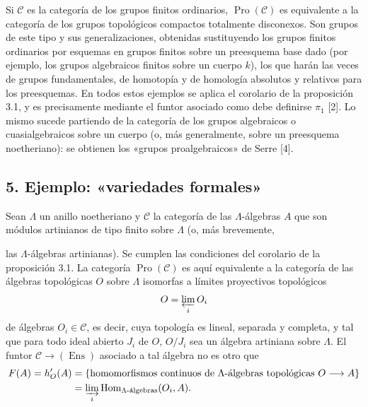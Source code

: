 \documentclass[11pt,twoside,openany]{book}
\numberwithin{equation}{section}
\newcommand{\src}[1]{%
  \phantomsection\hypertarget{src:#1}{}%
  \marginpar{\raggedleft\footnotesize\sffamily #1}%
}
\theoremstyle{plain}
\theoremstyle{definition}
\theoremstyle{remark}
\newcommand{\FgaUnitKey}{frontmatter}
\renewcommand{\src}[1]{%
  \phantomsection\hypertarget{src:\FgaUnitKey:#1}{}%
  \marginpar{\raggedleft\footnotesize\sffamily #1}%
}
\theoremstyle{plain}
\theoremstyle{definition}
\theoremstyle{remark}
\begin{document}
Si $\mathcal C$ es la categoría de los grupos finitos ordinarios,
$\operatorname{Pro}(\mathcal C)$ es equivalente a la categoría de los grupos
topológicos compactos totalmente disconexos. Son grupos de este tipo y sus
generalizaciones, obtenidas sustituyendo los grupos finitos ordinarios por
esquemas en grupos finitos sobre un preesquema base dado (por ejemplo, los
grupos algebraicos finitos sobre un cuerpo $k$), los que harán las veces de
grupos fundamentales, de homotopía y de homología absolutos y relativos para
los preesquemas. En todos estos ejemplos se aplica el corolario de la
proposición 3.1, y es precisamente mediante el funtor asociado como debe
definirse $\pi_1$ [2]. Lo mismo sucede partiendo de la categoría de los grupos
algebraicos o cuasialgebraicos sobre un cuerpo (o, más generalmente, sobre un
preesquema noetheriano): se obtienen los «grupos proalgebraicos» de Serre [4].

\subsection*{5. Ejemplo: «variedades formales»}

Sean $\Lambda$ un anillo noetheriano y $\mathcal C$ la categoría de las
$\Lambda$-álgebras $A$ que son módulos artinianos de tipo finito sobre
$\Lambda$ (o, más brevemente,

\src{375}
las $\Lambda$-álgebras artinianas). Se cumplen las condiciones del corolario de
la proposición 3.1. La categoría $\operatorname{Pro}(\mathcal C)$ es aquí
equivalente a la categoría de las álgebras topológicas $O$ sobre $\Lambda$
isomorfas a límites proyectivos topológicos
\[
  O=\varprojlim_i O_i
\]
de álgebras $O_i\in\mathcal C$, es decir, cuya topología es lineal, separada y
completa, y tal que para todo ideal abierto $J_i$ de $O$, $O/J_i$ sea un
álgebra artiniana sobre $\Lambda$. El funtor
$\mathcal C\longrightarrow(\operatorname{Ens})$ asociado a tal álgebra no es
otro que
\begin{align*}
  F(A)=h'_O(A)
  &=\{\text{homomorfismos continuos de $\Lambda$-álgebras topológicas }
       O\longrightarrow A\}\\
  &=\varinjlim_i
    \operatorname{Hom}_{\Lambda\text{-álgebras}}(O_i,A).
\end{align*}
\end{document}
